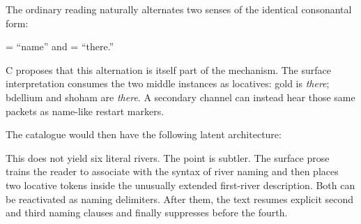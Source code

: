 
The ordinary reading naturally alternates two senses of the identical consonantal form:

\begin{center}
 = ``name'' \qquad and \qquad {} = ``there.''
\end{center}

C proposes that this alternation is itself part of the mechanism.  The surface interpretation consumes the two middle instances as locatives: gold is \emph{there}; bdellium and shoham are \emph{there}.  A secondary channel can instead hear those same packets as name-like restart markers.

The catalogue would then have the following latent architecture:


This does not yield six literal rivers.  The point is subtler.  The surface prose trains the reader to associate  with the syntax of river naming and then places two locative  tokens inside the unusually extended first-river description.  Both can be reactivated as naming delimiters.  After them, the text resumes explicit second and third naming clauses and finally suppresses  before the fourth.

